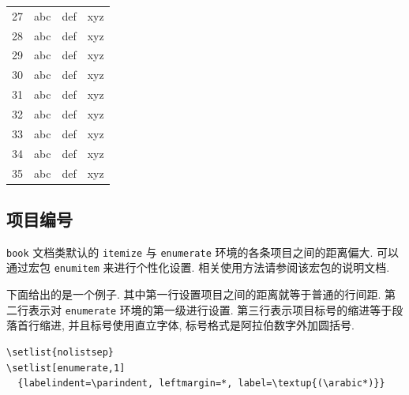 \begin{center}
\begin{longtable}{cccc}
    27 &  abc  &  def  &  xyz \\
    28 &  abc  &  def  &  xyz \\
    29 &  abc  &  def  &  xyz \\
    30 &  abc  &  def  &  xyz \\
    31 &  abc  &  def  &  xyz \\
    32 &  abc  &  def  &  xyz \\
    33 &  abc  &  def  &  xyz \\
    34 &  abc  &  def  &  xyz \\
    35 &  abc  &  def  &  xyz \\
  \end{longtable}
\end{center}

\subsection{项目编号}

\verb|book| 文档类默认的 \verb|itemize| 与 \verb|enumerate| 环境的各条项目之间的距离偏大. 可以通过宏包 \verb|enumitem| 来进行个性化设置. 相关使用方法请参阅该宏包的说明文档.

下面给出的是一个例子. 其中第一行设置项目之间的距离就等于普通的行间距. 第二行表示对 \verb|enumerate| 环境的第一级进行设置. 第三行表示项目标号的缩进等于段落首行缩进, 并且标号使用直立字体, 标号格式是阿拉伯数字外加圆括号.
\begin{verbatim}
\setlist{nolistsep}
\setlist[enumerate,1]
  {labelindent=\parindent, leftmargin=*, label=\textup{(\arabic*)}}
\end{verbatim}
